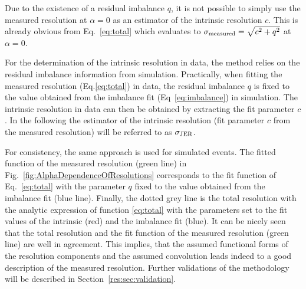 Due to the existence of a residual imbalance $q$, it is not possible to simply use the measured resolution at $\alpha=0$ as an estimator of the intrinsic resolution $c$.
This is already obvious from Eq.~\eqref{eq:total} which evaluates to $\sigma_\mathrm{measured}  = \sqrt{c^2 + q^2}$ at $\alpha=0$.

For the determination of the intrinsic resolution in data, the method relies on the residual imbalance information from simulation.
Practically, when fitting the measured resolution (Eq.\eqref{eq:total}) in data, the residual imbalance $q$ is fixed to the value obtained from the imbalance fit (Eq~\ref{eq:imbalance}) in simulation.
The intrinsic resolution in data can then be obtained by extracting the fit parameter $c$.
In the following the estimator of the intrinsic resolution (fit parameter $c$ from the measured resolution) will be referred to as $\sigma_\mathrm{JER}$.

For consistency, the same approach is used for simulated events.
The fitted function of the measured resolution (green line) in Fig.~\ref{fig:AlphaDependenceOfResolutions} corresponds to the fit function of Eq.~\eqref{eq:total} with the parameter $q$ fixed to the value obtained from the imbalance fit (blue line).
Finally, the dotted grey line is the total resolution with the analytic expression of function \eqref{eq:total} with the parameters set to the fit values of the intrinsic (red) and the imbalance fit (blue). 
It can be nicely seen that the total resolution and the fit function of the measured resolution (green line) are well in agreement.
This implies, that the assumed functional forms of the resolution components and the assumed convolution leads indeed to a good description of the measured resolution.
Further validations of the methodology will be described in Section~\ref{res:sec:validation}.

